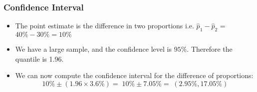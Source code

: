 \documentclass[a4]{beamer}
\begin{document}
\begin{frame}
\frametitle{Confidence Interval}
\begin{itemize}
\item The point estimate is the difference in two proportions i.e. $\hat{p}_1 - \hat{p}_2$ = $40 \% - 30 \% = 10 \%$
\item We have a large sample, and the confidence level is $95\%$. Therefore the quantile is 1.96.
\item We can now compute the confidence interval for the difference of proportions:
\[ 10\% \pm (1.96 \times 3.6 \%)  =\; 10\% \pm 7.05 \% = \;(2.95\%, 17.05\%) \]

\end{itemize}
\end{frame}
\end{document}
